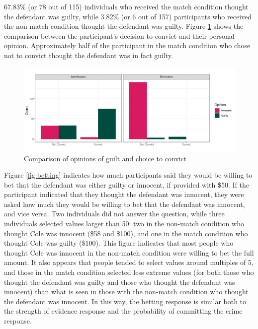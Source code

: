 \documentclass[print]{nuthesis}
\begin{document}
67.83\% (or 78 out of 115) individuals who received the match condition thought the defendant was guilty, while 3.82\% (or 6 out of 157) participants who received the non-match condition thought the defendant was guilty.
Figure \ref{fig:opinionguilt} shows the comparison between the participant's decision to convict and their personal opinion.
Approximately half of the participant in the match condition who chose not to convict thought the defendant was in fact guilty.

\begin{figure}

{\centering \includegraphics[width=\linewidth]{thesis_files/figure-latex/opinionguilt-1} 

}

\caption{Comparison of opinions of guilt and choice to convict}\label{fig:opinionguilt}
\end{figure}

Figure \ref{fig:betting} indicates how much participants said they would be willing to bet that the defendant was either guilty or innocent, if provided with \$50.
If the participant indicated that they thought the defendant was innocent, they were asked how much they would be willing to bet that the defendant was innocent, and vice versa.
Two individuals did not answer the question, while three individuals selected values larger than 50: two in the non-match condition who thought Cole was innocent (\$58 and \$100), and one in the match condition who thought Cole was guilty (\$100).
This figure indicates that most people who thought Cole was innocent in the non-match condition were willing to bet the full amount.
It also appears that people tended to select values around multiples of 5, and those in the match condition selected less extreme values (for both those who thought the defendant was guilty and those who thought the defendant was innocent) than what is seen in those with the non-match condition who thought the defendant was innocent.
In this way, the betting response is similar both to the strength of evidence response and the probability of committing the crime response.
\end{document}
